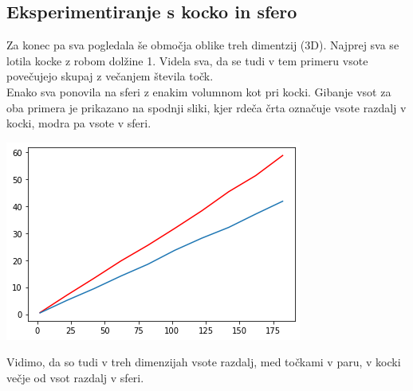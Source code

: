 \documentclass[12pt, a4paper]{article}
\begin{document}
\subsection{Eksperimentiranje s kocko in sfero}
Za konec pa sva pogledala še območja oblike treh dimentzij (3D). Najprej sva se lotila  kocke z robom dolžine 1. Videla sva, da se tudi v tem primeru vsote povečujejo skupaj z večanjem števila točk.\\
Enako sva ponovila na sferi z enakim volumnom kot pri kocki. Gibanje vsot za oba primera je prikazano na spodnji sliki, kjer rdeča črta označuje vsote razdalj v kocki, modra pa vsote v sferi.
\begin{center}
\includegraphics{primerjava_kocka_sfera.png}
\end{center}
Vidimo, da so tudi v treh dimenzijah vsote razdalj, med točkami v paru, v kocki večje od vsot razdalj v sferi.
\end{document}
